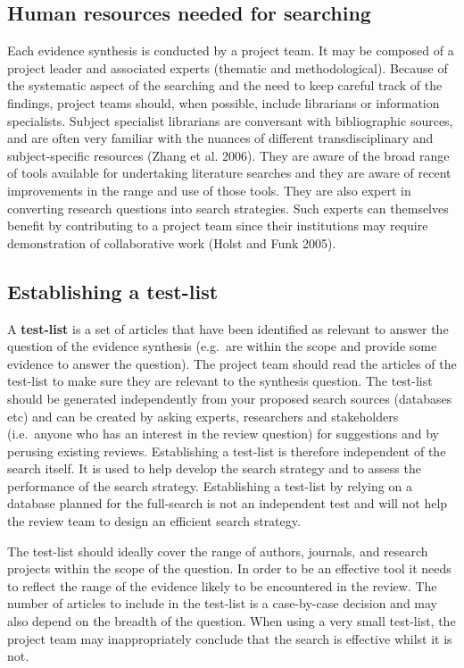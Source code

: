 \documentclass[
  letterpaper,
  DIV=11,
  numbers=noendperiod]{scrreprt}
\begin{document}
\subsection{Human resources needed for
searching}\label{human-resources-needed-for-searching}

Each evidence synthesis is conducted by a project team. It may be
composed of a project leader and associated experts (thematic and
methodological). Because of the systematic aspect of the searching and
the need to keep careful track of the findings, project teams should,
when possible, include librarians or information specialists. Subject
specialist librarians are conversant with bibliographic sources, and are
often very familiar with the nuances of different transdisciplinary and
subject-specific resources (Zhang et al. 2006). They are aware of the
broad range of tools available for undertaking literature searches and
they are aware of recent improvements in the range and use of those
tools. They are also expert in converting research questions into search
strategies. Such experts can themselves benefit by contributing to a
project team since their institutions may require demonstration of
collaborative work (Holst and Funk 2005).

\subsection{Establishing a test-list}\label{establishing-a-test-list}

A \textbf{test-list} is a set of articles that have been identified as
relevant to answer the question of the evidence synthesis (e.g.~are
within the scope and provide some evidence to answer the question). The
project team should read the articles of the test-list to make sure they
are relevant to the synthesis question. The test-list should be
generated independently from your proposed search sources (databases
etc) and can be created by asking experts, researchers and stakeholders
(i.e.~anyone who has an interest in the review question) for suggestions
and by perusing existing reviews. Establishing a test-list is therefore
independent of the search itself. It is used to help develop the search
strategy and to assess the performance of the search strategy.
Establishing a test-list by relying on a database planned for the
full-search is not an independent test and will not help the review team
to design an efficient search strategy.

The test-list should ideally cover the range of authors, journals, and
research projects within the scope of the question. In order to be an
effective tool it needs to reflect the range of the evidence likely to
be encountered in the review. The number of articles to include in the
test-list is a case-by-case decision and may also depend on the breadth
of the question. When using a very small test-list, the project team may
inappropriately conclude that the search is effective whilst it is not.
\end{document}
